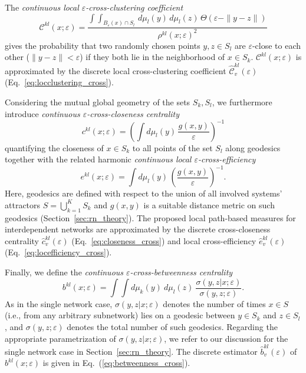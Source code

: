 \documentclass[graybox]{svmult}
\begin{document}
The \emph{continuous local $\varepsilon$-cross-clustering coefficient}
\begin{equation}
\mathcal{C}^{kl}(x;\varepsilon) = \frac{\int\!\!\!\int_{B_\varepsilon(x) \cap S_l} \,d\mu_l(y)\,d\mu_l(z)\, \Theta(\varepsilon-\|y-z\|)}{\rho^{kl}(x;\varepsilon)^2}
\end{equation}
gives the probability that two randomly chosen points $y,z\in S_l$ are $\varepsilon$-close to each other ($\|y-z\|<\varepsilon$) if they both lie in the neighborhood of $x\in S_k$. $\mathcal{C}^{kl}(x;\varepsilon)$ is approximated by the discrete local cross-clustering coefficient $\hat{\mathcal{C}}_v^{kl}(\varepsilon)$ (Eq.~\ref{eq:locclustering_cross}).

Considering the mutual global geometry of the sets $S_k,S_l$, we furthermore introduce \textit{continuous $\varepsilon$-cross-closeness centrality}
\begin{equation}
c^{kl}(x;\varepsilon) = \left( \int d\mu_l(y) \, \frac{g(x,y)}{\varepsilon} \right)^{-1}
\end{equation}
quantifying the closeness of $x\in S_k$ to all points of the set $S_l$ along geodesics together with the related harmonic \textit{continuous local $\varepsilon$-cross-efficiency}
\begin{equation}
e^{kl}(x;\varepsilon) = \int d\mu_l(y) \, \left( \frac{g(x,y)}{\varepsilon} \right)^{-1}.
\end{equation}
Here, geodesics are defined with respect to the union of all involved systems' attractors $S=\bigcup_{k=1}^K S_k$ and $g(x,y)$ is a suitable distance metric on such geodesics (Section~\ref{sec:rn_theory}). The proposed local path-based measures for interdependent networks are approximated by the discrete cross-closeness centrality $\hat{c}_v^{kl}(\varepsilon)$ (Eq.~\ref{eq:closeness_cross}) and local cross-efficiency $\hat{e}_v^{kl}(\varepsilon)$ (Eq.~\ref{eq:locefficiency_cross}). 

Finally, we define the \textit{continuous $\varepsilon$-cross-betweenness centrality}
\begin{equation}
b^{kl}(x;\varepsilon)=\int \int d\mu_k(y)\ d\mu_l(z)\ \frac{\sigma(y,z|x;\varepsilon)}{\sigma(y,z;\varepsilon)}.
\end{equation}
\noindent
As in the single network case, $\sigma(y,z|x;\varepsilon)$ denotes the number of times $x\in S$ (i.e., from any arbitrary subnetwork) lies on a geodesic between $y\in S_k$ and $z\in S_l$, and $\sigma(y,z;\varepsilon)$ denotes the total number of such geodesics. Regarding the appropriate parametrization of $\sigma(y,z|x;\varepsilon)$, we refer to our discussion for the single network case in Section~\ref{sec:rn_theory}. The discrete estimator $\hat{b}_v^{kl}(\varepsilon)$ of $b^{kl}(x;\varepsilon)$ is given in Eq.~(\ref{eq:betweenness_cross}).
\end{document}

